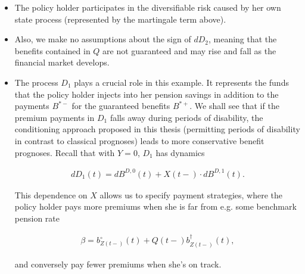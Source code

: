 \documentclass{book}
\newcommand{\1}[1]{\mathbbm{1}_{\left\lbrace #1 \right\rbrace}}
\theoremstyle{break}
\theoremstyle{remark}
\numberwithin{equation}{section}
\begin{document}
\begin{itemize}
	\item The policy holder participates in the diversifiable risk caused by her own state process (represented by the martingale term above).
	\item Also, we make no assumptions about the sign of $dD_2$, meaning that the benefits contained in $Q$ are not guaranteed and may rise and fall as the financial market develops.
	\item The process $D_1$ plays a crucial role in this example. It represents the funds that the policy holder injects into her pension savings in addition to the payments $B^{*-}$ for the guaranteed benefits $B^{*+}$. We shall see that if the premium payments in $D_1$ falls away during periods of disability, the conditioning approach proposed in this thesis (permitting periods of disability in contrast to classical prognoses) leads to more conservative benefit prognoses. Recall that with $Y=0$, $D_1$ has dynamics
	
	\begin{align*}
		dD_1(t) = dB^{D,0}(t) + X(t-) \cdot dB^{D,1}(t).
	\end{align*}

	This dependence on $X$ allows us to specify payment strategies, where the policy holder pays more premiums when she is far from e.g. some benchmark pension rate
	
	
	\begin{align*}
		\beta = b_{Z(t-)}^\circ(t) + Q(t-) b_{Z(t-)}^\dagger(t),
	\end{align*}
	
	and conversely pay fewer premiums when she's on track.
\end{itemize}
\end{document}
